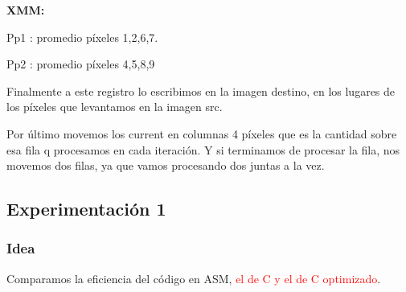 \par{\textbf{XMM:}}
\par {Pp1 : promedio píxeles {1,2,6,7}.}
\par{Pp2 : promedio píxeles {4,5,8,9}}
	
\par{Finalmente a este registro lo escribimos en la imagen destino, en los lugares de los píxeles que levantamos en la imagen src.}
\par{Por último movemos los current en columnas 4 píxeles que es la cantidad sobre esa fila q procesamos en cada iteración. Y si terminamos de procesar la fila, nos movemos dos filas, ya que vamos procesando dos juntas a la vez.}
	
\subsection{Experimentación 1}

\subsubsection{Idea}	
\par{Comparamos la eficiencia del código en ASM, \textcolor{red}{el de C y el de C optimizado}.}
	
